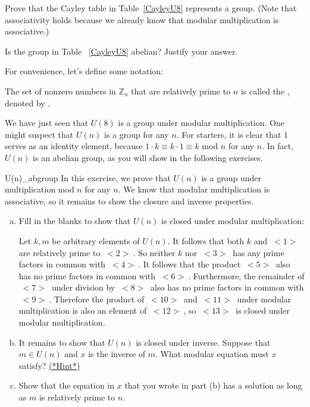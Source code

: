 \begin{exercise}{27}
Prove that the Cayley table in Table~\ref{CayleyU8} represents a group. (Note that associativity holds because we already know that modular multiplication is associative.)
\end{exercise}

\begin{exercise}{28}
Is the group in Table ~\ref{CayleyU8} abelian?  Justify your answer.
\end{exercise}
For convenience, let's define some notation:

\begin{defn}\label{DefnOfUnits}
The set of nonzero numbers in ${\mathbb Z}_n$ that are relatively prime to $n$ is called the , denoted by .
\end{defn}

  We have just seen that  $U(8)$ is a group under modular multiplication.  One might suspect that  $U(n)$ is a group for any $n$.  For starters, it is clear that $1$ serves as an  identity element, because $1\cdot k \equiv k \cdot 1 \equiv  k$ mod $n$ for any $n$. In fact, $U(n)$ is an abelian group, as you will show in the following exercises.

\begin{exercise}{U(n)_abgroup}
In this exercise, we prove that $U(n)$ is a group under multiplication mod $n$ for any $n$. We know that modular multiplication is associative, so it remains to show the closure and inverse properties.  
\begin{enumerate}[(a)]
\item
Fill in the blanks to show that $U(n)$ is closed under modular multiplication:

Let $k,m$ be arbitrary elements of  $U(n)$. It follows that both $k$ and \underline{$~<1>~$} are relatively prime to \underline{$~<2>~$}. So neither $k$ nor \underline{$~<3>~$} has any prime factors in common with \underline{$~<4>~$}. It follows that the product \underline{$~<5>~$} also has no prime factors in common with \underline{$~<6>~$}. Furthermore, the remainder of \underline{$~<7>~$} under division by \underline{$~<8>~$} also has no prime factors in common with \underline{$~<9>~$}. Therefore the product of \underline{$~<10>~$} and \underline{$~<11>~$} under modular multiplication is also an element of \underline{$~<12>~$}, so \underline{$~<13>~$} is closed under modular multiplication.
\item
It remains to show that $U(n)$ is closed under inverse. Suppose that $m \in U(n)$ and $x$ is the inverse of $m$. What modular equation must $x$ satisfy?
\hyperref[sec:groups:hints]{(*Hint*)}
\item Show that the equation in $x$ that you wrote in part (b) has a solution as long as $m$ is relatively prime to $n$.
\end{enumerate}
\end{exercise}  

